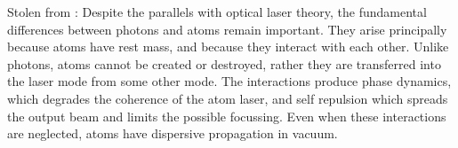 Stolen from \citep{Ballagh:2000oq}:
Despite the parallels with optical laser theory, the fundamental differences between photons and atoms remain important. They arise principally because atoms have rest mass, and because they interact with each other. Unlike photons, atoms cannot be created or destroyed, rather they are transferred into the laser mode from some other mode. The interactions produce phase dynamics, which degrades the coherence of the atom laser, and self repulsion which spreads the output beam and limits the possible focussing. Even when these interactions are neglected, atoms have dispersive propagation in vacuum.
